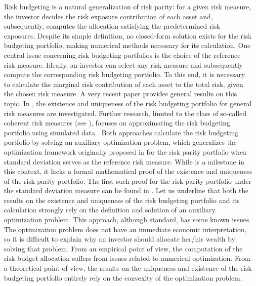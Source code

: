 \documentclass[preprint,11pt,authoryear]{elsarticle}
\begin{document}
Risk budgeting is a natural generalization of risk parity: for a given risk measure, the investor decides the risk exposure contribution of each asset and, subsequently, computes the allocation satisfying the predetermined risk exposures. Despite its simple definition, no closed-form solution exists for the risk budgeting portfolio, making numerical methods necessary for its calculation. One central issue concerning risk budgeting portfolios is the choice of the reference risk measure. Ideally, an investor can select any risk measure and subsequently compute the corresponding risk budgeting portfolio. To this end, it is necessary to calculate the marginal risk contribution of each asset to the total risk, given the chosen risk measure. A very recent paper provides general results on this topic. In \cite{cetingoz2024risk}, the existence and uniqueness of the risk budgeting portfolio for general risk measures are investigated. Further research, limited to the class of so-called coherent risk measures (see \cite{artzner1999coherent}), focuses on approximating the risk budgeting portfolio using simulated data \cite{da2023risk}. Both approaches calculate the risk budgeting portfolio by solving an auxiliary optimization problem, which generalizes the optimization framework originally proposed in \cite{maillard2010properties} for the risk parity portfolio when standard deviation serves as the reference risk measure. While \cite{maillard2010properties} is a milestone in this context, it lacks a formal mathematical proof of the existence and uniqueness of the risk parity portfolio. The first such proof for the risk parity portfolio under the standard deviation measure can be found in \cite{spinu}. Let us underline that both the results on the existence and uniqueness of the risk budgeting portfolio and its calculation strongly rely on the definition and solution of an auxiliary optimization problem. This approach, although standard, has some known issues. The optimization problem does not have an immediate economic interpretation, so it is difficult to explain why an investor should allocate her/his wealth by solving that problem. From an empirical point of view, the computation of the risk budget allocation suffers from issues related to numerical optimization. From a theoretical point of view, the results on the uniqueness and existence of the risk budgeting portfolio entirely rely on the convexity of the optimization problem.
\end{document}
